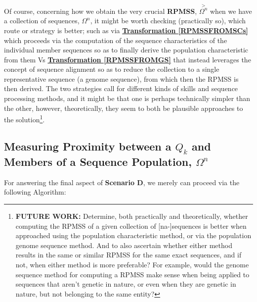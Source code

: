 \documentclass[a4paper, 18pt]{book} %
\begin{document}
Of course, concerning how we obtain the very crucial \textbf{RPMSS}, $\overset{>}{\Omega^n}$ when we have a collection of sequences, $\Omega^n$, it might be worth checking (practically so), which route or strategy is better; such as via \textbf{\hyperref[RPMSSFROMSCs]{Transformation \ref{RPMSSFROMSCs}}} which proceeds via the computation of the sequence characteristics of the individual member sequences so as to finally derive the population characteristic from them Vs  \textbf{\hyperref[RPMSSFROMGS]{Transformation \ref{RPMSSFROMGS}}} that instead leverages the concept of sequence alignment so as to reduce the collection to a single representative sequence (a genome sequence), from which then the RPMSS is then derived. The two strategies call for different kinds of skills and sequence processing methods, and it might be that one is perhaps technically simpler than the other, however, theoretically, they seem to both be plausible approaches to the solution\footnote{\textbf{FUTURE WORK:} Determine, both practically and theoretically, whether computing the RPMSS of a given collection of [na-]sequences is better when approached using the population characteristic method, or via the population genome sequence method. And to also ascertain whether either method results in the same or similar RPMSS for the same exact sequences, and if not, when either method is more preferable? For example, would the genome sequence method for computing a RPMSS make sense when being applied to sequences that aren't genetic in nature, or even when they are genetic in nature, but not belonging to the same entity?}.




\subsection{Measuring Proximity between a $Q_k$ and Members of a Sequence Population, $\Omega^n$}
\label{SECSEQPROXSEQ}

For answering the final aspect of \textbf{Scenario D}, we merely can proceed via the following Algorithm:
\end{document}
